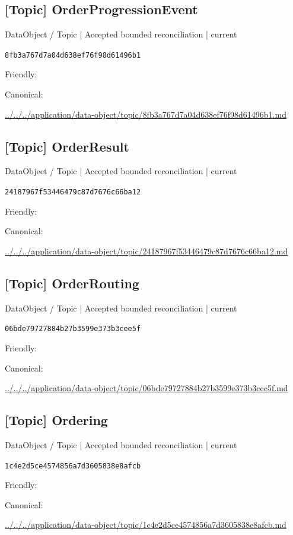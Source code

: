 \documentclass[10pt,a4paper]{article}
\begin{document}
\subsection*{[Topic] OrderProgressionEvent}
{\small DataObject / Topic | Accepted bounded reconciliation | current}\par
\texttt{8fb3a767d7a04d638ef76f98d61496b1}\par
Friendly: \par
Canonical: \par
{\footnotesize\url{../../../application/data-object/topic/8fb3a767d7a04d638ef76f98d61496b1.md}}\par
\subsection*{[Topic] OrderResult}
{\small DataObject / Topic | Accepted bounded reconciliation | current}\par
\texttt{24187967f53446479c87d7676c66ba12}\par
Friendly: \par
Canonical: \par
{\footnotesize\url{../../../application/data-object/topic/24187967f53446479c87d7676c66ba12.md}}\par
\subsection*{[Topic] OrderRouting}
{\small DataObject / Topic | Accepted bounded reconciliation | current}\par
\texttt{06bde79727884b27b3599e373b3cee5f}\par
Friendly: \par
Canonical: \par
{\footnotesize\url{../../../application/data-object/topic/06bde79727884b27b3599e373b3cee5f.md}}\par
\subsection*{[Topic] Ordering}
{\small DataObject / Topic | Accepted bounded reconciliation | current}\par
\texttt{1c4e2d5ce4574856a7d3605838e8afcb}\par
Friendly: \par
Canonical: \par
{\footnotesize\url{../../../application/data-object/topic/1c4e2d5ce4574856a7d3605838e8afcb.md}}\par
\end{document}
